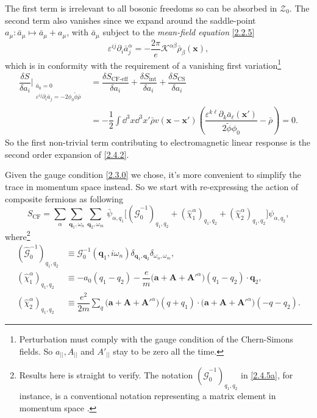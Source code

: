\documentclass[bachelor,english,numbers]{ustcthesis}
\begin{document}
		The first term is irrelevant to all bosonic freedoms so can be absorbed in $\mathcal{Z}_0$. The second term also vanishes since we expand around the saddle-point $a_\mu: \bar{a}_\mu\mapsto \bar{a}_\mu+a_\mu$, with $\bar{a}_\mu$ subject to the \emph{mean-field equation} \eqref{2.2.5}
		\begin{equation}\label{2.4.3}
			\varepsilon^{ij}\partial_i \bar{a}_j^\alpha=-\dfrac{2\pi}{e}\mathcal{K}^{\alpha \beta}\bar{\rho}_\beta(\bm{x}),
		\end{equation}
		which is in conformity with the requirement of a vanishing first variation\footnote{Perturbation must comply with the gauge condition of the Chern-Simons fields. So $a_{||}, A_{||}$ and $A'_{||}$ stay to be zero all the time.}
		\begin{align*}
			\dfrac{\delta S}{\delta a_i}\bigg|_{\substack{\bar{a}_0=0\\\varepsilon^{ij}\partial_i\bar{a}_j=-2\phi_0\widetilde{\phi}\bar{\rho}}}&=\dfrac{\delta S_{\text{CF-eff}}}{\delta a_i}+\dfrac{\delta S_{\text{int}}}{\delta a_i}+\dfrac{\delta S_{\text{CS}}}{\delta a_i}\\
			&=-\dfrac{1}{2}\int\dd^3 x\dd^3 x' \bar{\rho}v(\bm{x}-\bm{x'})\left(\dfrac{\varepsilon^{k\ell}\partial_k \bar{a}_\ell(\bm{x'})}{2\widetilde{\phi}\phi_0}-\bar{\rho}\right)=0.
		\end{align*}
		So the first non-trivial term contributing to electromagnetic linear response is the second order expansion of \eqref{2.4.2}.\par
		Given the gauge condition \eqref{2.3.0} we chose, it's more convenient to simplify the trace in momentum space instead. So we start with re-expressing the action of composite fermions as following
		\begin{equation}\label{2.4.4}
			S_{\text{CF}}=\sum_\alpha\sum_{\bm{q}_1,\omega_n}\sum_{\bm{q}_2,\omega_m}\,\bar{\psi}_{\alpha,q_1}\bigg[(\hat{\mathcal{G}}_0^{-1})_{q_1,q_2}+(\hat{\chi}^\alpha_1)_{q_1,q_2}+(\hat{\chi}^\alpha_2)_{q_1,q_2}\bigg]\psi_{\alpha,q_2},
		\end{equation} 
		where\footnote{Results here is straight to verify. The notation $(\hat{\mathcal{G}}_0^{-1})_{q_1,q_2}$ in \eqref{2.4.5a}, for instance, is a conventional notation representing a matrix element in momentum space \cite{altland2010condensed,nagaosa2013quantum}.}
		\begin{subequations} %
		\begin{align}
			(\hat{\mathcal{G}}_0^{-1})_{q_1,q_2}&\equiv \mathcal{G}_0^{-1}(\bm{q}_1,i\omega_n)\delta_{\bm{q}_1,\bm{q}_2}\delta_{\omega_n,\omega_m},\label{2.4.5a}\\
			(\hat{\chi}^\alpha_1)_{q_1,q_2}&\equiv-a_0(q_1-q_2)-\dfrac{e}{m}\bigg(\bm{a}+\bm{A}+\bm{A'}^\alpha\bigg)(q_1-q_2)\cdot \bm{q}_2,\label{2.4.5b}\\
			(\hat{\chi}^\alpha_2)_{q_1,q_2}&\equiv\dfrac{e^2}{2m}\sum_{q}\bigg(\bm{a}+\bm{A}+\bm{A'}^\alpha\bigg)(q+q_1)\cdot \bigg(\bm{a}+\bm{A}+\bm{A'}^\alpha\bigg)(-q-q_2)\label{2.4.5c}.
		\end{align}
		\end{subequations}
\end{document}
